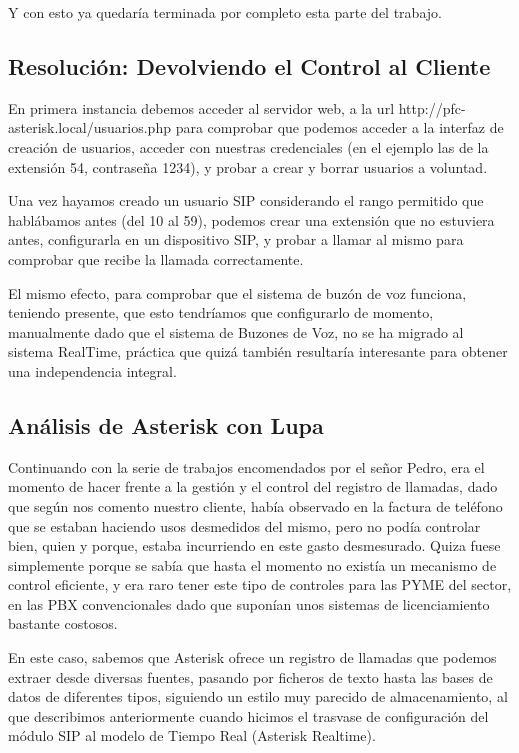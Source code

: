 Y con esto ya quedaría terminada por completo esta parte del trabajo.

\subsection{Resolución: Devolviendo el Control al Cliente}

En primera instancia debemos acceder al servidor web, a la url http://pfc-asterisk.local/usuarios.php para comprobar que podemos acceder a la interfaz de creación de usuarios, acceder con nuestras credenciales (en el ejemplo las de la extensión 54, contraseña 1234), y probar a crear y borrar usuarios a voluntad.

Una vez hayamos creado un usuario SIP considerando el rango permitido que hablábamos antes (del 10 al 59), podemos crear una extensión que no estuviera antes, configurarla en un dispositivo SIP, y probar a llamar al mismo para comprobar que recibe la llamada correctamente.

El mismo efecto, para comprobar que el sistema de buzón de voz funciona, teniendo presente, que esto tendríamos que configurarlo de momento, manualmente dado que el sistema de Buzones de Voz, no se ha migrado al sistema RealTime, práctica que quizá también resultaría interesante para obtener una independencia integral.

\newpage

\subsection{Análisis de Asterisk con Lupa}

Continuando con la serie de trabajos encomendados por el señor Pedro, era el momento de hacer frente a la gestión y el control del registro de llamadas, dado que según nos comento nuestro cliente, había observado en la factura de teléfono que se estaban haciendo usos desmedidos del mismo, pero no podía controlar bien, quien y porque, estaba incurriendo en este gasto desmesurado. Quiza fuese simplemente porque se sabía que hasta el momento no existía un mecanismo de control eficiente, y era raro tener este tipo de controles para las PYME del sector, en las PBX convencionales dado que suponían unos sistemas de licenciamiento bastante costosos.

En este caso, sabemos que Asterisk ofrece un registro de llamadas que podemos extraer desde diversas fuentes, pasando por ficheros de texto hasta las bases de datos de diferentes tipos, siguiendo un estilo muy parecido de almacenamiento, al que describimos anteriormente cuando hicimos el trasvase de configuración del módulo SIP al modelo de Tiempo Real (Asterisk Realtime).

